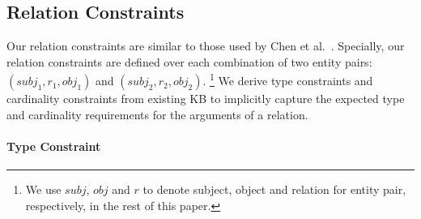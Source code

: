 

\subsection{Relation Constraints}
\label{sec:constraints}



Our relation constraints are similar to those used by  Chen et al.~.
Specially,
our relation constraints are defined over each combination of two entity pairs:$(subj_1, r_1, obj_1)$ and $(subj_2,  r_2, obj_2)$.
\footnote{We use $subj$, $obj$ and $r$ to denote subject, object and relation for entity pair, respectively, in the rest of this paper.}
We derive type constraints and cardinality constraints from existing KB to implicitly capture the expected type and cardinality requirements for the arguments of a relation.


\paragraph{Type Constraint}


